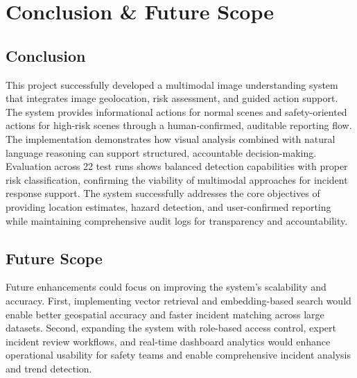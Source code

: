 \chapter{Conclusion \& Future Scope}

\section{Conclusion}

This project successfully developed a multimodal image understanding system that integrates image geolocation, risk assessment, and guided action support. The system provides informational actions for normal scenes and safety-oriented actions for high-risk scenes through a human-confirmed, auditable reporting flow. The implementation demonstrates how visual analysis combined with natural language reasoning can support structured, accountable decision-making. Evaluation across 22 test runs shows balanced detection capabilities with proper risk classification, confirming the viability of multimodal approaches for incident response support. The system successfully addresses the core objectives of providing location estimates, hazard detection, and user-confirmed reporting while maintaining comprehensive audit logs for transparency and accountability.

\section{Future Scope}

Future enhancements could focus on improving the system's scalability and accuracy. First, implementing vector retrieval and embedding-based search would enable better geospatial accuracy and faster incident matching across large datasets. Second, expanding the system with role-based access control, expert incident review workflows, and real-time dashboard analytics would enhance operational usability for safety teams and enable comprehensive incident analysis and trend detection.

